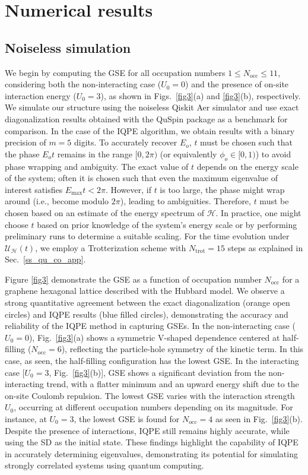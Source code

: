 \documentclass[twocolumn,superscriptaddress,amsmath,amssymb,showpacs,floatfix,preprintnumbers]{revtex4-1}
\newcommand{\mc}{\mathcal}
\newcommand{\mr}{\mathrm}
\begin{document}
\section{Numerical results} \label{s_con}

\subsection{Noiseless simulation} \label{ss_nois_less}
We begin by computing the GSE for all occupation numbers $1 \leq N_\mr{occ} \leq 11$, considering 
both the non-interacting case ($U_0=0$) and the presence of on-site interaction energy ($U_0 = 3$),
as shown in Figs.~\ref{fig3}(a) and \ref{fig3}(b), respectively.
%
We simulate our structure using the noiseless Qiskit Aer simulator and use exact diagonalization
results obtained with the QuSpin package \cite{QuSpin} as a benchmark for comparison.
%
In the case of the IQPE algorithm, we obtain results with a binary precision of $m=5$ digits.
%
To accurately recover $E_o$, $t$ must be chosen such that the phase $E_o t$ remains in the range
$[0, 2\pi)$ (or equivalently $\phi_o \in [0, 1)$) to avoid phase wrapping and ambiguity.
%
The exact value of $t$ depends on the energy scale of the system; often it is chosen such that even 
the maximum eigenvalue of interest satisfies $E_\mr{max} t < 2 \pi$.
%
However, if $t$ is too large, the phase might wrap around (i.e., become modulo $2\pi$), leading 
to ambiguities. 
%
Therefore, $t$ must be chosen based on an estimate of the energy spectrum of $\mc H$.
%
In practice, one might choose $t$ based on prior knowledge of the system's energy scale or by
performing preliminary runs to determine a suitable scaling. 
%
For the time evolution under $\mc {U_H} (t)$, we employ a Trotterization scheme with 
$N_\mr{trot} = 15$ steps as explained in Sec.~\ref{ss_qu_co_app}.

Figure \ref{fig3} demonstrate the GSE as a function of occupation number $N_\mr{occ}$ for a graphene
hexagonal lattice described with the Hubbard model. 
%
We observe a strong quantitative agreement between the exact diagonalization (orange open circles) 
and IQPE results (blue filled circles), demonstrating the accuracy and reliability of the IQPE method 
in capturing GSEs.
%
In the non-interacting case ($U_0=0$), Fig.~\ref{fig3}(a) shows a symmetric V-shaped dependence centered at half-filling ($N_\mathrm{occ}=6$),
reflecting the particle-hole symmetry of the kinetic term.
%
In this case, as seen, the half-filling configuration has the lowest GSE. 
%
In the interacting case [$U_0=3$, Fig.~\ref{fig3}(b)], GSE shows a significant deviation from the
non-interacting trend, with a flatter minimum and an upward energy shift due to the on-site 
Coulomb repulsion. 
%
The lowest GSE varies with the interaction strength $U_0$, occurring at different occupation numbers
depending on its magnitude. 
%
For instance, at $U_0=3$, the lowest GSE is found for $N_\mr{occ}=4$ as seen in Fig.~\ref{fig3}(b).
%
Despite the presence of interactions, IQPE still remains highly accurate, while using the SD as 
the initial state. 
%
These findings highlight the capability of IQPE in accurately determining eigenvalues,
demonstrating its potential for simulating strongly correlated systems using quantum computing.
\end{document}
